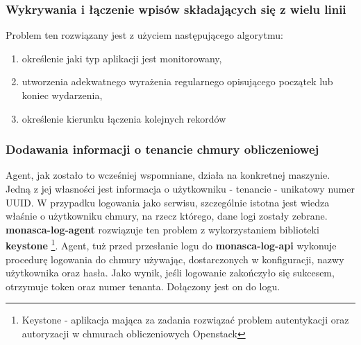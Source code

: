         \subsubsection{Wykrywania i łączenie wpisów składających się z wielu linii}
            Problem ten rozwiązany jest z użyciem następującego algorytmu:
            \begin{enumerate}
                \item określenie jaki typ aplikacji jest monitorowany,
                \item utworzenia adekwatnego wyrażenia regularnego opisującego początek lub koniec wydarzenia,
                \item określenie kierunku łączenia kolejnych rekordów
            \end{enumerate}
            
            
        \subsubsection{Dodawania informacji o tenancie chmury obliczeniowej}
            Agent, jak zostało to wcześniej wspomniane, działa na konkretnej maszynie. Jedną z jej własności jest
            informacja o użytkowniku - tenancie - unikatowy numer UUID. W przypadku logowania jako serwisu,
            szczególnie istotna jest wiedza właśnie o użytkowniku chmury, na rzecz którego, dane logi zostały
            zebrane. \textbf{monasca-log-agent} rozwiązuje ten problem z wykorzystaniem biblioteki \textbf{keystone}
            \footnote{Keystone - aplikacja mająca za zadania rozwiązać problem autentykacji oraz autoryzacji w
                chmurach obliczeniowych Openstack}. 
            Agent, tuż przed przesłanie logu do \textbf{monasca-log-api} wykonuje procedurę logowania do chmury
            używając, dostarczonych w konfiguracji, nazwy użytkownika oraz hasła. Jako wynik, jeśli logowanie 
            zakończyło się sukcesem, otrzymuje token oraz numer tenanta. Dołączony jest on do logu.
            
